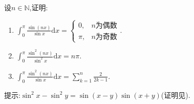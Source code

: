 \documentclass[../../main.tex]{subfiles}
\begin{document}
\begin{proposition}\label{example:经典定积分(必记)}
设$n\in \mathbb{N}$,证明:
\begin{enumerate}[(1)]
\item $\int_0^{\pi}{\frac{\sin \left( nx \right)}{\sin x}\mathrm{d}x}= 
\begin{cases}
0, & n\text{为偶数} \\
\pi, & n\text{为奇数}
\end{cases}.$

\item $\int_0^{\pi}{\frac{\sin ^2\left( nx \right)}{\sin ^2x}}\mathrm{d}x=n\pi$.

\item $\int_0^{\pi}{\frac{\sin ^2\left( nx \right)}{\sin x}}\mathrm{d}x=\sum_{k=1}^n{\frac{2}{2k-1}}$.
\end{enumerate}
\end{proposition}
\begin{note}
提示:$\sin ^2x-\sin ^2y=\sin \left( x-y \right) \sin \left( x+y \right)$(证明见).
\end{note}
\end{document}
